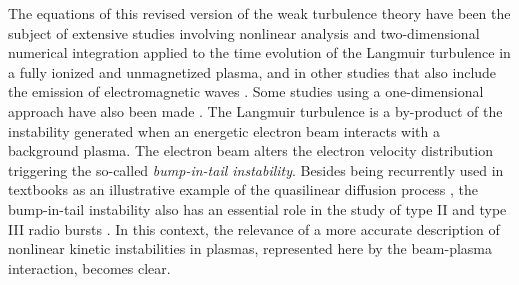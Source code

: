 \documentclass[12pt,a4paper,ruledheader]{report}
\begin{document}
The equations of this revised version of the weak turbulence theory
have been the subject of extensive studies involving nonlinear analysis
and two-dimensional numerical integration applied to the time evolution
of the Langmuir turbulence \cite{ZGPY08,Ziebell2012,YZGLW12,
  ZYGP14a,ZYGP14b} in a fully ionized and unmagnetized plasma, and in
other studies that also include the emission of electromagnetic waves
\cite{ZYSGP14c,ZYPGP15,ZPYGP16}. Some studies
using a one-dimensional approach have also been made 
\cite{ZiebellGY01,GaelzerZY02,GZVYR08}.
%
%
The Langmuir turbulence is a by-product 
of the instability generated when an energetic electron beam interacts with
a background plasma. The electron beam alters the electron velocity
distribution triggering the so-called \emph{bump-in-tail instability}.
Besides being recurrently used in textbooks as an illustrative example
of the quasilinear diffusion process \cite{akhi2,chen,gurnett2017}, the
bump-in-tail instability also has an essential role in the study of type
II and type III radio bursts \cite{Emslie1984,Hannah2009,ZVST11,Hannah2011,
  KK12,RR14,BNKR14}. In this context, the relevance of a more accurate
description of nonlinear kinetic instabilities in plasmas, represented
here by the beam-plasma interaction, becomes clear.
\end{document}

